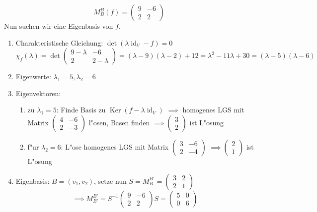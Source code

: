\documentclass[fontsize=11pt,paper=a4,BCOR=0mm,DIV=11,automark,headsepline]{scrbook}
\DeclareMathOperator{\mKer}{Ker}
\DeclareMathOperator{\mId}{id}
\theoremstyle{remark}
\theoremstyle{definition}
\theoremstyle{proof}
\theoremstyle{remark}
\begin{document}
\begin{exa}[Eigenwertberechnung]
  \[M^B_B(f) =
    \begin{pmatrix}
      9 & -6 \\
      2 & 2
    \end{pmatrix}\]
  Nun suchen wir eine Eigenbasis von \(f\).
  \begin{enumerate}
  \item Charakteristische Gleichung: \(\det(\lambda\mId_V-f)=0\)
    \[\chi_f(\lambda) = \det\begin{pmatrix}9-\lambda & -6 \\ 2 & 2-\lambda\end{pmatrix} = (\lambda - 9)(\lambda - 2) + 12 = \lambda^2 - 11\lambda + 30 = (\lambda-5)(\lambda-6)\]
  \item Eigenwerte: \(\lambda_1 = 5, \lambda_2 = 6\)
  \item Eigenvektoren:
    \begin{enumerate}
    \item zu \(\lambda_1 = 5\): Finde Basis zu \(\mKer(f - \lambda\mId_V)\) \(\implies\) homogenes LGS mit Matrix \(
        \begin{pmatrix}
          4 & -6 \\
          2 & -3
        \end{pmatrix}
      \) l"osen, Basen finden \(\implies\begin{pmatrix}3\\2\end{pmatrix}\) ist L"osung
    \item f"ur \(\lambda_2 = 6\): L"ose homogenes LGS mit Matrix \(
        \begin{pmatrix}
          3 & -6 \\
          2 & -4
        \end{pmatrix}
\) \(\implies\begin{pmatrix}2\\1\end{pmatrix}\) ist L"osung
\end{enumerate}
\item Eigenbasis: \(B = (v_1, v_2)\), setze nun \(S = M^{B'}_B=\begin{pmatrix}3 & 2\\ 2 & 1\end{pmatrix}\)
  \[\implies M^{B'}_{B'}=S^{-1}\begin{pmatrix}9 & -6 \\ 2 & 2 \end{pmatrix}S = \begin{pmatrix}5 & 0 \\ 0 & 6 \end{pmatrix}\]
  \end{enumerate}
\end{exa}
\end{document}
